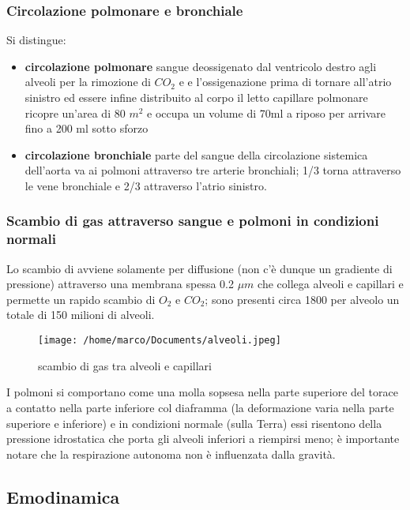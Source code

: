 \documentclass[10pt]{article}
\begin{document}
\subsubsection{Circolazione polmonare e bronchiale}

Si distingue:
\begin{itemize}
    \item  \textbf{circolazione polmonare} sangue deossigenato dal ventricolo destro agli alveoli per la rimozione di $CO_2$ e e l'ossigenazione prima di tornare all'atrio sinistro ed essere infine distribuito al corpo \textrightarrow il letto capillare polmonare ricopre un'area di 80 $m^2$ e occupa un volume di 70ml a riposo per arrivare fino a 200 ml sotto sforzo
    \item \textbf{circolazione bronchiale} parte del sangue della circolazione sistemica dell'aorta va ai polmoni attraverso tre arterie bronchiali; 1/3 torna attraverso le vene bronchiale e 2/3 attraverso l'atrio sinistro.
\end{itemize}

\subsubsection{Scambio di gas attraverso sangue e polmoni in condizioni normali}

Lo scambio di  avviene solamente per diffusione (non c'è dunque un gradiente di pressione) attraverso una membrana spessa 0.2 $\mu m$ che collega alveoli e capillari e permette un rapido scambio di $O_2$ e $CO_2$; sono presenti circa 1800 per alveolo un totale di 150 milioni di alveoli.

\begin{figure}[h!]
\centering
\texttt{[image: /home/marco/Documents/alveoli.jpeg]}
\caption{scambio di gas tra alveoli e capillari}
\label{fig:scambio}
\end{figure}

I polmoni si comportano come una molla sopsesa nella parte superiore del torace a contatto nella parte inferiore col diaframma (la deformazione varia nella parte superiore e inferiore) e in condizioni normale (sulla Terra) essi risentono della pressione idrostatica che porta gli alveoli inferiori a riempirsi meno; è importante notare che la respirazione autonoma non è influenzata dalla gravità.

\subsection{Emodinamica}
\end{document}

